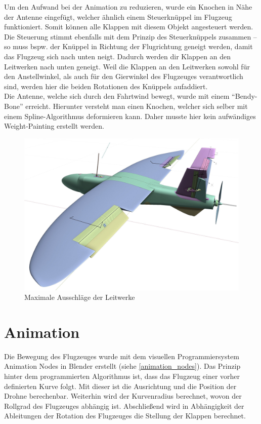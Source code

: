 Um den Aufwand bei der Animation zu reduzieren, wurde ein Knochen in Nähe der Antenne eingefügt, welcher ähnlich einem Steuerknüppel im Flugzeug funktioniert. Somit können alle Klappen mit diesem Objekt angesteuert werden. Die Steuerung stimmt ebenfalls mit dem Prinzip des Steuerknüppels zusammen -- so muss bspw. der Knüppel in Richtung der Flugrichtung geneigt werden, damit das Flugzeug sich nach unten neigt. Dadurch werden dir Klappen an den Leitwerken nach unten geneigt. Weil die Klappen an den Leitwerken sowohl für den Anstellwinkel, als auch für den Gierwinkel des Flugzeuges verantwortlich sind, werden hier die beiden Rotationen des Knüppels aufaddiert.\\
Die Antenne, welche sich durch den Fahrtwind bewegt, wurde mit einem ``Bendy-Bone'' erreicht. Hierunter versteht man einen Knochen, welcher sich selber mit einem Spline-Algorithmus deformieren kann. Daher musste hier kein aufwändiges Weight-Painting erstellt werden. 

\begin{figure}[H]
\begin{center}
\includegraphics[width=\textwidth]{gfx/prod/plane/plane8.jpg}
\caption{Maximale Ausschläge der Leitwerke}
\label{rigged_plane}
\end{center}
\end{figure}

\section{Animation}

Die Bewegung des Flugzeuges wurde mit dem visuellen Programmiersystem Animation Nodes in Blender erstellt (siehe \autoref{animation_nodes}). Das Prinzip hinter dem programmierten Algorithmus ist, dass das Flugzeug einer vorher definierten Kurve folgt. Mit dieser ist die Ausrichtung und die Position der Drohne berechenbar. Weiterhin wird der Kurvenradius berechnet, wovon der Rollgrad des Flugzeuges abhängig ist. Abschließend wird in Abhängigkeit der Ableitungen der Rotation des Flugzeuges die Stellung der Klappen berechnet.

